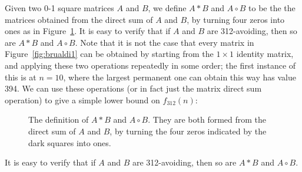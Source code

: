 \documentclass[11pt,english]{article}
\theoremstyle{plain}
\theoremstyle{remark}
\begin{document}

Given two 0-1 square matrices $A$ and $B$, we define $A\ast B$ and $A\circ B$ to be the the matrices obtained from the direct sum of $A$ and $B$, by turning four zeros into ones as in Figure~\ref{fig:operations}. It is easy to verify that if $A$ and $B$ are 312-avoiding, then so are $A\ast B$ and $A\circ B$. Note that it is not the case that every matrix in Figure~\ref{fig:brualdi1} can be obtained by starting from the $1\times 1$ identity matrix, and applying these two operations repeatedly in some order; the first instance of this is at $n=10$, where the largest permanent one can obtain this way has value 394. We can use these operations (or in fact just the matrix direct sum operation) to give a simple lower bound on $f_{312}(n)$:
\begin{figure}[hbt]
\centering
{}
\hspace{1cm}
\caption{The definition of $A\ast B$ and $A\circ B$. They are both formed from the direct sum of $A$ and $B$, by turning the four zeros indicated by the dark squares into ones. }
\label{fig:operations}
\end{figure}
\iffalse
It is easy to verify that if $A$ and $B$ are 312-avoiding, then so are $A\ast B$ and $A\circ B$.
\end{document}
